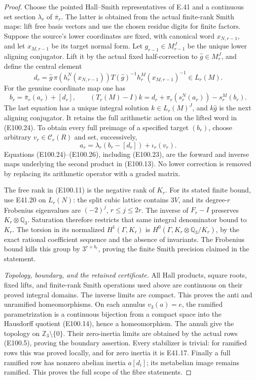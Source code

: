 \begin{proof}
Choose the pointed Hall--Smith
representatives of E.41 and a continuous
set section $\lambda_r$ of $\bar\pi_r$.
The latter is obtained from the actual
finite-rank Smith maps: lift free
basis vectors and use the chosen
residue digits for finite factors.
Suppose the source's lower coordinates
are fixed, with canonical word $x_{N,r-1}$,
and let $x_{M,r-1}$ be its target
normal form. Let $g_{r-1}\in M_{r-1}^J$
be the unique lower aligning conjugator.
Lift it by the actual fixed
half-correction to $\widehat g\in M_r^J$,
and define the central element
\[
 d_r=\widehat g\,\pi(h_r^N(x_{N,r-1}))
          T(\widehat g)^{-1}
          h_r^M(x_{M,r-1})^{-1}\in L_r(M).
 \tag{E100.24}
\]
For the genuine coordinate map one has
\[
 b_r=\bar\pi_r(a_r)+[d_r],\qquad
 (T_r(M)-I)k
       =d_r+\pi_r(s_r^N(a_r))-s_r^M(b_r).
 \tag{E100.25}
\]
The last equation has a unique integral
solution $k\in L_r(M)^J$, and
$k\widehat g$ is the next aligning
conjugator. It retains the full
arithmetic action on the lifted word
in (E100.24). To obtain every full
preimage of a specified target
$(b_r)$, choose arbitrary
$v_r\in\mathcal C_r(R)$ and set,
successively,
\[
             a_r=\lambda_r(b_r-[d_r])+\iota_r(v_r).
 \tag{E100.26}
\]
Equations (E100.24)--(E100.26), including
(E100.23), are the forward and inverse
maps underlying the second product
in (E100.13). No lower correction is
removed by replacing its arithmetic
operator with a graded matrix.

The free rank in (E100.11) is the
negative rank of $K_r$. For its stated
finite bound, use E41.20 on $L_r(N)$:
the split cubic lattice contains
$3V$, and its degree-$r$ Frobenius
eigenvalues are $(-2)^j$, $r\le j\le2r$.
The inverse of $F_r-I$ preserves
$K_r\otimes\mathbb Q_3$. Saturation
therefore restricts that same integral
denominator bound to $K_r$.
The torsion in its normalized
$H^1(\Gamma,K_r)$ is
$H^0(\Gamma,K_r\otimes\mathbb Q_3/K_r)$,
by the exact rational coefficient
sequence and the absence of invariants.
The Frobenius bound kills this group
by $3^{r+b_r}$, proving the finite
Smith precision claimed in the
statement.

\emph{Topology, boundary, and the retained certificate.}
All Hall products, square roots, fixed
lifts, and finite-rank Smith operations
used above are continuous on their
proved integral domains. The inverse
limits are compact. This proves the
anti and unramified homeomorphisms.
On each annulus $v_3(a)=e$, the
ramified parametrization is a
continuous bijection from a compact
space into the Hausdorff quotient
(E100.14), hence a homeomorphism.
The annuli give the topology on
$\mathbb Z_3\setminus\{0\}$.
Their zero-inertia limits are obtained
by the actual rows (E100.5), proving
the boundary assertion. Every
stabilizer is trivial: for ramified
rows this was proved locally, and
for zero inertia it is E41.17.
Finally a full ramified row has
nonzero abelian inertia $a[d_i]$;
its metabelian image remains
ramified. This proves the full
scope of the fibre statements.


\end{proof}
